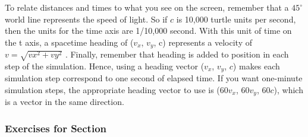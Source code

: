 \documentclass{book}
\begin{document}
To relate distances and times to what you see on the screen, remember
that a $45^{\circ}$ world line represents the speed of light. So if $c$ is 10,000
turtle units per second, then the units for the time axis are 1/10,000
second. With this unit of time on the t axis, a spacetime heading of
($v_x$, $v_y$, c) represents a velocity of $v = \sqrt{vx^2 + vy^2}$ . Finally, remember
that heading is added to position in each step of the simulation. Hence,
using a heading vector ($v_x$, $v_y$, $c$) makes each simulation step correspond
to one second of elapsed time. If you want one-minute simulation steps,
the appropriate heading vector to use is ($60v_x$, $60v_y$, $60c$), which is a
vector in the same direction.

\subsubsection{Exercises for Section \thesection}
\end{document}
